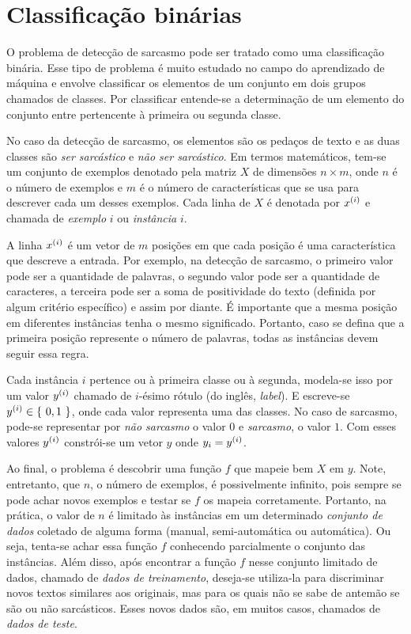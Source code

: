 \section{Classificação binárias}%
\label{sec:classificacao_binarias}

O problema de detecção de sarcasmo pode ser tratado como uma classificação
binária. Esse tipo de problema é muito estudado no campo do aprendizado de
máquina e envolve classificar os elementos de um conjunto em dois grupos
chamados de classes. Por classificar entende-se a determinação de um elemento do
conjunto entre pertencente à primeira ou segunda classe.

No caso da detecção de sarcasmo, os elementos são os pedaços de texto e as duas
classes são \textit{ser sarcástico} e \textit{não ser sarcástico}. Em termos
matemáticos, tem-se um conjunto de exemplos denotado pela matriz $X$ de
dimensões $n\times m$, onde $n$ é o número de exemplos e $m$ é o número de
características que se usa para descrever cada um desses exemplos. Cada linha de
$X$ é denotada por $\xii[x]{i}$ e chamada de \textit{exemplo} $i$ ou
\textit{instância} $i$.

A linha $\xii[x]{i}$ é um vetor de $m$ posições em que cada posição é uma
característica que descreve a entrada. Por exemplo, na detecção de sarcasmo, o
primeiro valor pode ser a quantidade de palavras, o segundo valor pode ser a
quantidade de caracteres, a terceira pode ser a soma de positividade do texto
(definida por algum critério específico) e assim por diante. É importante que a
mesma posição em diferentes instâncias tenha o mesmo significado. Portanto, caso
se defina que a primeira posição represente o número de palavras, todas as
instâncias devem seguir essa regra.

Cada instância $i$ pertence ou à primeira classe ou à segunda, modela-se isso
por um valor $\xii[y]{i}$ chamado de $i$-ésimo rótulo (do inglês,
\textit{label}). E escreve-se $\xii[y]{i}\in\set{0, 1}$, onde cada valor
representa uma das classes. No caso de sarcasmo, pode-se representar por
\textit{não sarcasmo} o valor $0$ e \textit{sarcasmo}, o valor $1$. Com esses
valores $\xii[y]{i}$ constrói-se um vetor $y$ onde $y_i=\xii[y]{i}$.

Ao final, o problema é descobrir uma função $f$ que mapeie bem $X$ em $y$. Note,
entretanto, que $n$, o número de exemplos, é possivelmente infinito, pois sempre
se pode achar novos exemplos e testar se $f$ os mapeia corretamente. Portanto,
na prática, o valor de $n$ é limitado às instâncias em um determinado
\textit{conjunto de dados} coletado de alguma forma (manual, semi-automática ou
automática). Ou seja, tenta-se achar essa função $f$ conhecendo parcialmente o
conjunto das instâncias. Além disso, após encontrar a função $f$ nesse conjunto
limitado de dados, chamado de \textit{dados de treinamento}, deseja-se
utiliza-la para discriminar novos textos similares aos originais, mas para os
quais não se sabe de antemão se são ou não sarcásticos. Esses novos dados são,
em muitos casos, chamados de \textit{dados de teste}.

